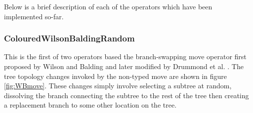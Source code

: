\documentclass[a4paper,11pt]{article}
\begin{document}
Below is a brief description of each of the operators which have been
implemented so-far.

\subsubsection{ColouredWilsonBaldingRandom}

This is the first of two operators based the branch-swapping move
operator first proposed by Wilson and Balding \cite{Wilson1998} and
later modified by Drummond et al. \cite{Drummond2002}. The tree
topology changes invoked by the non-typed move are shown in figure
\ref{fig:WBmove}.  These changes simply involve selecting a subtree at
random, dissolving the branch connecting the subtree to the rest of
the tree then creating a replacement branch to some other location on
the tree.
\end{document}
